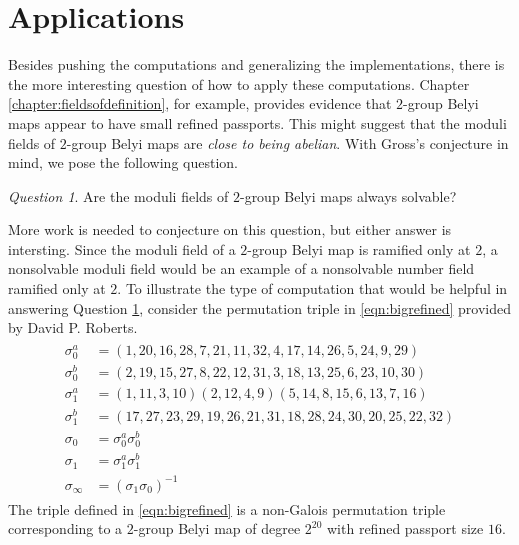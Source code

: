 \documentclass{dcthesis}
\numberwithin{equation}{section}
\theoremstyle{definition}
\theoremstyle{remark}
\newtheorem{question}[equation]{Question}
\begin{document}
{{{  \section{Applications}{\label{sec:futureapplications}
    Besides pushing the computations and generalizing
    the implementations,
    there is the more interesting question of
    how to apply these computations.
    Chapter \ref{chapter:fieldsofdefinition},
    for example,
    provides evidence that
    $2$-group Belyi maps appear
    to have small refined passports.
    This might suggest that the moduli fields
    of $2$-group Belyi maps
    are
    \emph{close to being abelian}.
    With Gross's conjecture in mind,
    we pose the following question.
    \begin{question}
      \label{ques:solvable}
      Are the moduli fields of
      $2$-group Belyi maps always solvable?
    \end{question}
    More work is needed to conjecture on this question,
    but either answer is intersting.
    Since the moduli field of a $2$-group
    Belyi map is ramified only at $2$,
    a nonsolvable moduli field would be
    an example of a nonsolvable number field
    ramified only at $2$.
    To illustrate the type of computation that
    would be helpful in answering
    Question
    \ref{ques:solvable},
    consider the permutation
    triple in
    \eqref{eqn:bigrefined}
    provided by
    David P. Roberts.
    \begin{align}
      \label{eqn:bigrefined}
      \begin{split}
        \sigma_0^a &= (1, 20, 16, 28, 7, 21, 11, 32, 4, 17, 14, 26, 5, 24, 9, 29)\\
        \sigma_0^b &= (2, 19, 15, 27, 8, 22, 12, 31, 3, 18, 13, 25, 6, 23, 10, 30)\\
        \sigma_1^a &= (1, 11, 3, 10)(2, 12, 4, 9)(5, 14, 8, 15, 6, 13, 7, 16)\\
        \sigma_1^b &= (17, 27, 23, 29, 19, 26, 21, 31, 18, 28, 24, 30, 20, 25, 22, 32)\\
        \sigma_0 &= \sigma_0^a\sigma_0^b\\
        \sigma_1 &= \sigma_1^a\sigma_1^b\\
        \sigma_\infty &= (\sigma_1\sigma_0)^{-1}
      \end{split}
    \end{align}
    The triple defined in
    \eqref{eqn:bigrefined}
    is a non-Galois permutation triple
    corresponding to a
    $2$-group Belyi map of degree
    $2^{20}$
    with refined passport size $16$.
}}}}
\end{document}
